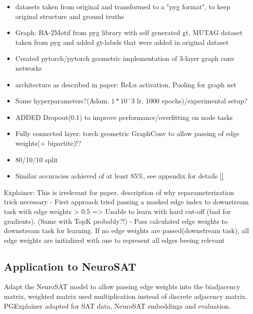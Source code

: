 \begin{itemize}
    \item datasets taken from original and transformed to a "pyg format", to keep original structure and ground truths
    \item Graph: BA-2Motif from pyg library with self generated gt, MUTAG dataset taken from pyg and added gt-labels that were added in original dataset
    \item Created pytorch/pytorch geometric implementation of 3-layer graph conv networks
    \item architecture as described in paper: ReLu activation, Pooling for graph net
    \item Same hyperparameters?(Adam, $1*10^-3$ lr, 1000 epochs)/experimental setup?
    \item ADDED Dropout(0.1) to improve performance/overfitting on node tasks
    \item Fully connected layer: torch geometric GraphConv to allow passing of edge weights(+ bipartite)!?
    \item 80/10/10 split
    \item Similar accuracies achieved of at least $85\%$, see appendix for details \ref{}
\end{itemize}
 

 Explainer:
 This is irrelevant for paper, description of why reparameterization trick necessary
 - First approach tried passing a masked edge index to downstream task with edge weights > 0.5
 => Unable to learn with hard cut-off (bad for gradients). (Same with TopK probably?!)
 - Pass calculated edge weights to downstream task for learning. If no edge weights are passed(downstream task), all edge weights are initialized with one to represent all edges beeing relevant
 

\subsection{Application to NeuroSAT}
\label{sec:Application_to_NeuroSAT}
Adapt the NeuroSAT model to allow passing edge weights into the biadjacency matrix, weighted matrix used multiplication instead of discrete adjacency matrix. PGExplainer adapted for SAT data, NeuroSAT embeddings and evaluation.


